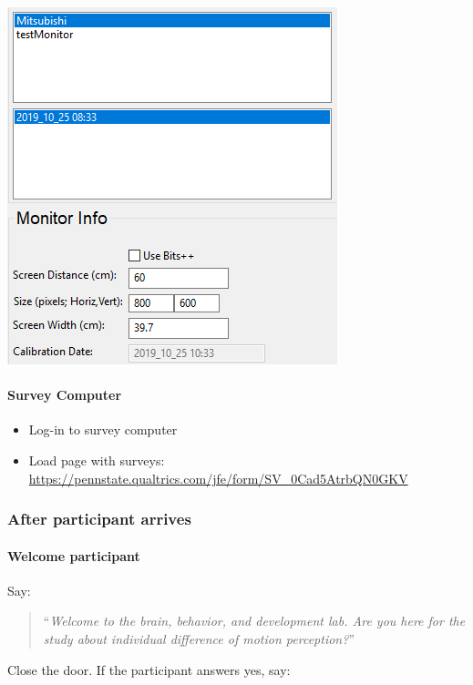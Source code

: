 \documentclass[]{article}
\providecommand{\tightlist}{%
  \setlength{\itemsep}{0pt}\setlength{\parskip}{0pt}}
\let\oldparagraph\paragraph
\renewcommand{\paragraph}[1]{\oldparagraph{#1}\mbox{}}
\begin{document}
\begin{itemize}
  \includegraphics{images/pp3.PNG}
\end{itemize}

\paragraph{Survey Computer}\label{survey-computer}

\begin{itemize}
\tightlist
\item
  Log-in to survey computer
\item
  Load page with surveys:
  \url{https://pennstate.qualtrics.com/jfe/form/SV_0Cad5AtrbQN0GKV}
\end{itemize}

\subsubsection{After participant
arrives}\label{after-participant-arrives}

\paragraph{Welcome participant}\label{welcome-participant}

Say:

\begin{quote}
``\emph{Welcome to the brain, behavior, and development lab. Are you
here for the study about individual difference of motion perception?}''
\end{quote}

Close the door. If the participant answers yes, say:
\end{document}
